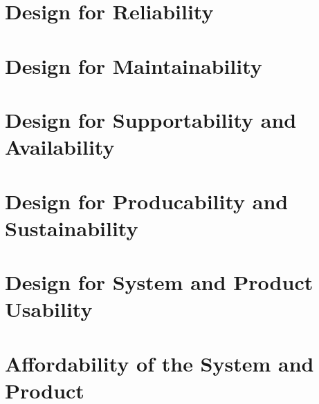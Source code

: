 \documentclass[11pt,fleqn]{book} %
\begin{document}
  \chapter{Design for Reliability}
  
  \chapter{Design for Maintainability}
  
  \chapter{Design for Supportability and Availability}
  
  \chapter{Design for Producability and Sustainability}
  
  \chapter{Design for System and Product Usability}
  
  \chapter{Affordability of the System and Product}
  
\end{document}
